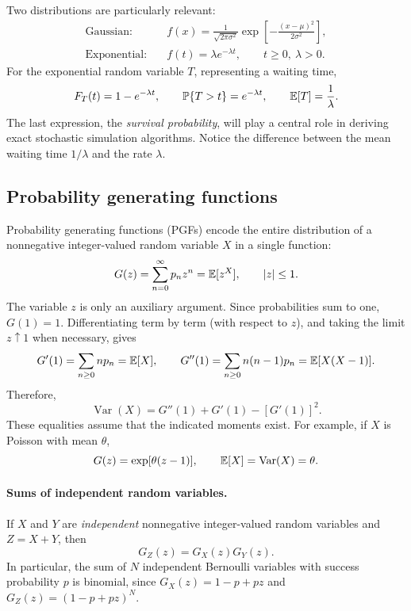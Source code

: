 Two distributions are particularly relevant:
\begin{align}
 \text{Gaussian:}\quad &f(x)=\frac{1}{\sqrt{2\pi\sigma^2}}
 \exp\!\left[-\frac{(x-\mu)^2}{2\sigma^2}\right],\\
 \text{Exponential:}\quad &f(t)=\lambda e^{-\lambda t},\qquad t\geq0,\ \lambda>0.
 \label{eq:basic_exponential_pdf}
\end{align}
For the exponential random variable $T$, representing a waiting time,
\begin{equation}
 F_T(t)=1-e^{-\lambda t},\qquad
 {\mathbb P}\{T>t\}=e^{-\lambda t},\qquad
 {\mathbb E}[T]=\frac{1}{\lambda}.
 \label{eq:basic_exp_waiting}
\end{equation}
The last expression, the \emph{survival probability}, will play a central role in deriving exact stochastic simulation algorithms. Notice the difference between the mean waiting time $1/\lambda$ and the rate $\lambda$.

\subsection{Probability generating functions}
\label{sec:basic_pgf}
Probability generating functions (PGFs) encode the entire distribution of a nonnegative integer-valued random variable $X$ in a single function:
\begin{equation}
 G(z)=\sum_{n=0}^{\infty}p_nz^n ={\mathbb E}[z^X], \qquad |z|\leq1.
 \label{GenFunc_Def}
\end{equation}
The variable $z$ is only an auxiliary argument. Since probabilities sum to one, $G(1)=1$. Differentiating term by term (with respect to $z$), and taking the limit $z\uparrow 1$ when necessary, gives
\begin{equation}
 G'(1)=\sum_{n\geq0}np_n={\mathbb E}[X],\qquad
 G''(1)=\sum_{n\geq0}n(n-1)p_n={\mathbb E}[X(X-1)].
\end{equation}
Therefore,
\begin{equation}
 \boxed{\operatorname{Var}(X)=G''(1)+G'(1)-[G'(1)]^2.}
 \label{eq:basic_pgf_variance}
\end{equation}
These equalities assume that the indicated moments exist. For example, if $X$ is Poisson with mean $\theta$,
\begin{equation}
 G(z)=\exp[\theta(z-1)],\qquad
 {\mathbb E}[X]=\operatorname{Var}(X)=\theta.
\end{equation}

\paragraph{Sums of independent random variables.}
If $X$ and $Y$ are \emph{independent} nonnegative integer-valued random variables and $Z=X+Y$, then
\begin{equation}
 G_Z(z)=G_X(z)G_Y(z).
 \label{eq:basic_pgf_product}
\end{equation}
In particular, the sum of $N$ independent Bernoulli variables with success probability $p$ is binomial, since $G_X(z)=1-p+pz$ and $G_Z(z)=(1-p+pz)^N$.

